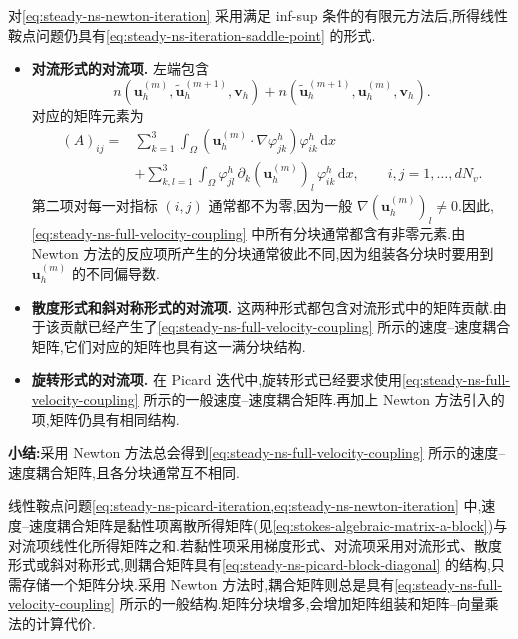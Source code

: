 \begin{note}\label{note:steady-ns-newton-matrix-structure}
对\cref{eq:steady-ns-newton-iteration} 采用满足 inf-sup 条件的有限元方法后,所得线性鞍点问题仍具有\cref{eq:steady-ns-iteration-saddle-point} 的形式.
\begin{itemize}
  \item \textbf{对流形式的对流项.}
  左端包含
  \[
    n(\bm{u}_h^{(m)},\widetilde{\bm{u}}_h^{(m+1)},\bm{v}_h)
       +n(\widetilde{\bm{u}}_h^{(m+1)},\bm{u}_h^{(m)},\bm{v}_h).
  \]
  对应的矩阵元素为
  \[
  \begin{aligned}
    (A)_{ij}
      ={}&\sum_{k=1}^{3}\int_\Omega
          (\bm{u}_h^{(m)}\cdot\nabla\varphi_{jk}^h)
             \varphi_{ik}^h\,\mathrm{d}x\\
        &+\sum_{k,l=1}^{3}\int_\Omega
          \varphi_{jl}^h\,\partial_k(\bm{u}_h^{(m)})_l
             \,\varphi_{ik}^h\,\mathrm{d}x,
       \qquad i,j=1,\ldots,dN_v .
  \end{aligned}
  \]
  第二项对每一对指标 $(i,j)$ 通常都不为零,因为一般
  $\nabla(\bm{u}_h^{(m)})_l\ne0$.因此,\cref{eq:steady-ns-full-velocity-coupling} 中所有分块通常都含有非零元素.由 Newton 方法的反应项所产生的分块通常彼此不同,因为组装各分块时要用到 $\bm{u}_h^{(m)}$ 的不同偏导数.

  \item \textbf{散度形式和斜对称形式的对流项.}
  这两种形式都包含对流形式中的矩阵贡献.由于该贡献已经产生了\cref{eq:steady-ns-full-velocity-coupling} 所示的速度--速度耦合矩阵,它们对应的矩阵也具有这一满分块结构.

  \item \textbf{旋转形式的对流项.}
  在 Picard 迭代中,旋转形式已经要求使用\cref{eq:steady-ns-full-velocity-coupling} 所示的一般速度--速度耦合矩阵.再加上 Newton 方法引入的项,矩阵仍具有相同结构.
\end{itemize}
\textbf{小结:}采用 Newton 方法总会得到\cref{eq:steady-ns-full-velocity-coupling} 所示的速度--速度耦合矩阵,且各分块通常互不相同.
\end{note}

\begin{note}[速度--速度耦合的存储需求与计算代价]\label{note:steady-ns-velocity-coupling-cost}
线性鞍点问题\cref{eq:steady-ns-picard-iteration,eq:steady-ns-newton-iteration} 中,速度--速度耦合矩阵是黏性项离散所得矩阵(见\cref{eq:stokes-algebraic-matrix-a-block})与对流项线性化所得矩阵之和.若黏性项采用梯度形式、对流项采用对流形式、散度形式或斜对称形式,则耦合矩阵具有\cref{eq:steady-ns-picard-block-diagonal} 的结构,只需存储一个矩阵分块.采用 Newton 方法时,耦合矩阵则总是具有\cref{eq:steady-ns-full-velocity-coupling} 所示的一般结构.矩阵分块增多,会增加矩阵组装和矩阵--向量乘法的计算代价.
\end{note}

